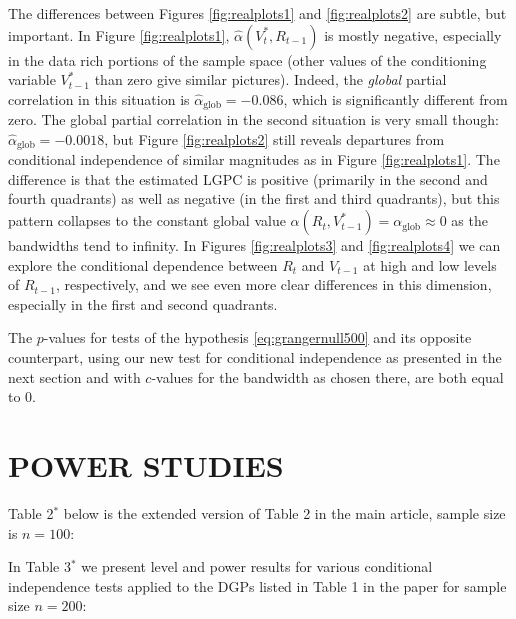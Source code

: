 \documentclass[
  12pt,
  letterpaper]{article}
\numberwithin{equation}{section}
\begin{document}
The differences between Figures \ref{fig:realplots1} and \ref{fig:realplots2} are subtle, but important. In Figure \ref{fig:realplots1}, \(\widehat\alpha(V_t^*, R_{t-1})\) is mostly negative, especially in the data rich portions of the sample space (other values of the conditioning variable \(V_{t-1}^*\) than zero give similar pictures). Indeed, the \emph{global} partial correlation in this situation is \(\widehat{\alpha}_{\textrm{glob}} = -0.086\), which is significantly different from zero. The global partial correlation in the second situation is very small though: \(\widehat{\alpha}_{\textrm{glob}} = -0.0018\), but Figure \ref{fig:realplots2} still reveals departures from conditional independence of similar magnitudes as in Figure \ref{fig:realplots1}. The difference is that the estimated LGPC is positive (primarily in the second and fourth quadrants) as well as negative (in the first and third quadrants), but this pattern collapses to the constant global value \(\alpha(R_t, V_{t-1}^*) = \alpha_{\textrm{glob}} \approx 0\) as the bandwidths tend to infinity. In Figures \ref{fig:realplots3} and \ref{fig:realplots4} we can explore the conditional dependence between \(R_t\) and \(V_{t-1}\) at high and low levels of \(R_{t-1}\), respectively, and we see even more clear differences in this dimension, especially in the first and second quadrants.

The \(p\)-values for tests of the hypothesis \eqref{eq:grangernull500} and its opposite counterpart, using our new test for conditional independence as presented in the next section and with \(c\)-values for the bandwidth as chosen there, are both equal to 0.

\hypertarget{power-studies}{%
\section{POWER STUDIES}\label{power-studies}}

Table 2\(^*\) below is the extended version of Table 2 in the main article, sample size is \(n=100\):

\vspace{1cm}



\newpage

In Table 3\(^*\) we present level and power results for various conditional independence tests applied to the DGPs listed in Table 1 in the paper for sample size \(n = 200\):


\end{document}
